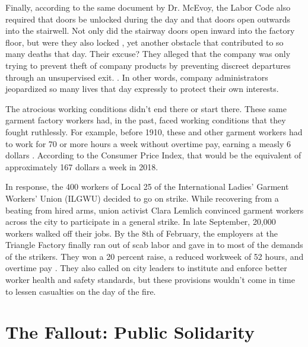 \documentclass[12pt]{article}
\begin{document}
Finally, according to the same document by Dr. McEvoy, the Labor Code also
required that doors be unlocked during the day and that doors open outwards into
the stairwell. Not only did the stairway doors open inward into the factory
floor, but were they also locked \parencite[628]{Ev1995}, yet another obstacle
that contributed to so many deaths that day. Their excuse? They alleged that the
company was only trying to prevent theft of company products by preventing
discreet departures through an unsupervised exit. \parencite{Ev1995}. In other
words, company administrators jeopardized so many lives that day expressly to
protect their own interests.

The atrocious working conditions didn't end there or start there. These same
garment factory workers had, in the past, faced working conditions that they
fought ruthlessly. For example, before 1910, these and other garment workers had
to work for 70 or more hours a week without overtime pay, earning a measly 6
dollars \parencite{von2004triangle}. According to the Consumer Price Index, that
would be the equivalent of approximately 167 dollars a week in 2018.

In response, the 400 workers of Local 25 of the International Ladies' Garment
Workers' Union (ILGWU) decided to go on strike. While recovering from a beating
from hired arms, union activist Clara Lemlich convinced garment workers
across the city to participate in a general strike. In late September, 20,000
workers walked off their jobs. By the 8th of February, the employers at the
Triangle Factory finally ran out of scab labor
and gave in to most of the demands of the strikers. They won a 20 percent raise,
a reduced workweek of 52 hours, and overtime pay \parencite{von2004triangle}.
They also called on city leaders to institute and enforce better worker health
and safety standards, but these provisions wouldn't come in time to lessen
casualties on the day of the fire.




\section{The Fallout: Public Solidarity}
\end{document}
